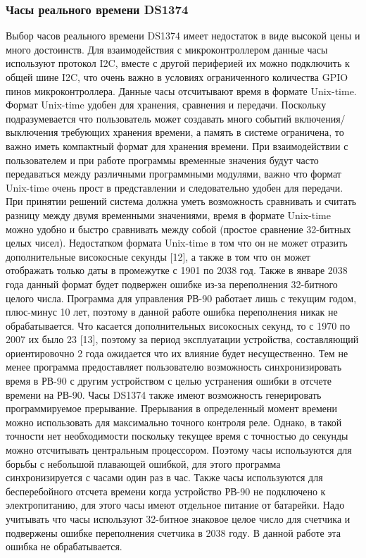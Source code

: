 \subsubsection{ Часы реального времени DS1374}
Выбор часов реального времени DS1374 имеет недостаток в виде высокой цены и много достоинств. 
Для взаимодействия с микроконтроллером данные часы используют протокол I2C, вместе с другой периферией их можно подключить к общей шине I2C, что очень важно в условиях ограниченного количества GPIO пинов  микроконтроллера.
Данные часы отсчитывают время в формате Unix-time. Формат Unix-time удобен для хранения, сравнения и передачи. Поскольку подразумевается что пользователь может создавать много событий включения/выключения требующих хранения времени, а память в системе ограничена, то важно иметь компактный формат для хранения времени. При взаимодействии с пользователем и при работе программы временные значения будут часто передаваться между различными программными модулями, важно что формат Unix-time очень прост в представлении и следовательно удобен для передачи. При принятии решений система должна уметь возможность сравнивать и считать разницу между двумя временными значениями, время в формате Unix-time можно удобно и быстро сравнивать между собой (простое сравнение 32-битных целых чисел). Недостатком формата Unix-time в том что он не может отразить дополнительные високосные секунды [12], а также в том что он может отображать только даты в промежутке с 1901 по 2038 год. Также в январе 2038 года данный формат будет подвержен ошибке из-за переполнения 32-битного целого числа. Программа для управления РВ-90 работает лишь с текущим годом, плюс-минус 10 лет, поэтому в данной работе ошибка переполнения никак не обрабатывается. Что касается дополнительных високосных секунд, то с 1970 по 2007 их было 23 [13], поэтому за период эксплуатации устройства, составляющий ориентировочно 2 года ожидается что их влияние будет несущественно. Тем не менее программа предоставляет пользователю возможность синхронизировать время в РВ-90 с другим устройством с целью устранения ошибки в отсчете времени на РВ-90. Часы DS1374 также имеют возможность генерировать программируемое прерывание.
Прерывания в определенный момент времени можно использовать для максимально точного контроля реле. Однако, в такой точности нет необходимости поскольку текущее время с точностью до секунды можно отсчитывать центральным процессором. Поэтому часы используются для борьбы с небольшой плавающей ошибкой, для этого программа синхронизируется с часами один раз в час. Также часы используются для бесперебойного отсчета времени когда устройство РВ-90 не подключено к электропитанию, для этого часы имеют отдельное питание от батарейки. Надо учитывать что часы используют 32-битное знаковое целое число для счетчика и подвержены ошибке переполнения счетчика в 2038 году. В данной работе эта ошибка не обрабатывается.  
